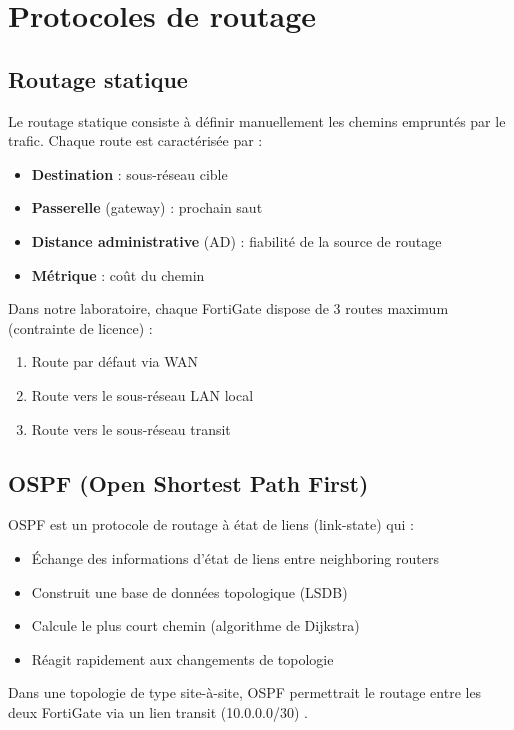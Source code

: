\section{Protocoles de routage}

\subsection{Routage statique}

Le routage statique consiste à définir manuellement les chemins empruntés par le trafic. Chaque route est caractérisée par :
\begin{itemize}
    \item \textbf{Destination} : sous-réseau cible
    \item \textbf{Passerelle} (gateway) : prochain saut
    \item \textbf{Distance administrative} (AD) : fiabilité de la source de routage
    \item \textbf{Métrique} : coût du chemin
\end{itemize}

Dans notre laboratoire, chaque FortiGate dispose de 3 routes maximum (contrainte de licence) :
\begin{enumerate}
    \item Route par défaut via WAN
    \item Route vers le sous-réseau LAN local
    \item Route vers le sous-réseau transit
\end{enumerate}

\subsection{OSPF (Open Shortest Path First)}

OSPF est un protocole de routage à état de liens (link-state) qui :
\begin{itemize}
    \item Échange des informations d'état de liens entre neighboring routers
    \item Construit une base de données topologique (LSDB)
    \item Calcule le plus court chemin (algorithme de Dijkstra)
    \item Réagit rapidement aux changements de topologie
\end{itemize}

Dans une topologie de type site-à-site, OSPF permettrait le routage entre les deux FortiGate via un lien transit (10.0.0.0/30) \cite{10}.

